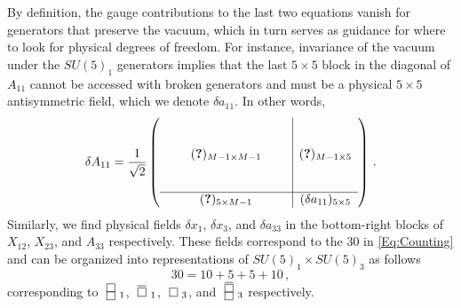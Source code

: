 \documentclass[a4paper,12pt]{article}
\newcommand{\drawsquare}[2]{\hbox{%
\rule{#2pt}{#1pt}\hskip-#2pt%
\rule{#1pt}{#2pt}\hskip-#1pt%
\rule[#1pt]{#1pt}{#2pt}}\rule[#1pt]{#2pt}{#2pt}\hskip-#2pt%
\rule{#2pt}{#1pt}}%
\newcommand{\fund}{~\raisebox{-.5pt}{\drawsquare{6.5}{0.4}}~}
\newcommand{\antifund}{~\overline{\raisebox{-.5pt}{\drawsquare{6.5}{0.4}}}~}
\newcommand{\asymm}{~\raisebox{-3.5pt}{\drawsquare{6.5}{0.4}}\hskip-6.9pt%
        \raisebox{3pt}{\drawsquare{6.5}{0.4}}~}%
\newcommand{\antiasymm}{~\overline{\raisebox{-3.5pt}{\drawsquare{6.5}{0.4}}\hskip-6.9pt%
        \raisebox{3pt}{\drawsquare{6.5}{0.4}}}~}%
\begin{document}
{By definition, the gauge contributions to the last two equations vanish for generators that preserve the vacuum, which in turn serves as guidance for where to look for physical degrees of freedom. For instance, invariance of the vacuum under the $SU(5)_1$ generators implies that the last $5\times 5$ block in the diagonal of $A_{11}$ cannot be accessed with broken generators and must be a physical $5\times 5$ antisymmetric field, which we denote $\delta a_{11}$. In other words,
\begin{equation}
	\delta	{A}_{11} = \frac{1}{\sqrt{2}}\left(\begin{array}{ccccc|c}
		  & &  &   &  & \\
	 	  & &  &   &  & \\
		  & & (\boldsymbol{?})_{M-1 \times M-1}  &   &  & (\boldsymbol{?})_{M-1 \times 5} \\
		  &  &  &   &  & \\
		  &  &  &   &  & \\ \hline
		  &  & (\boldsymbol{?})_{5 \times M-1} &  & & (\delta a_{11})_{5\times5} \\
	\end{array} \right)\, .
\end{equation}
Similarly, we find physical fields $\delta x_1$, $\delta x_3$, and $\delta a_{33}$ in the bottom-right blocks of $X_{12}$, $X_{23}$, and $A_{33}$ respectively. These fields correspond to the 30 in \eqref{Eq:Counting} and can be organized into representations of $SU(5)_1 \times SU(5)_3$ as follows\begin{equation}
	30 = 10 +5 +5 + 10 \, , 
\end{equation}
corresponding to $\asymm_1$, $\antifund_1$, $\fund_3$, and $\antiasymm_3$ respectively.

}
\end{document}
